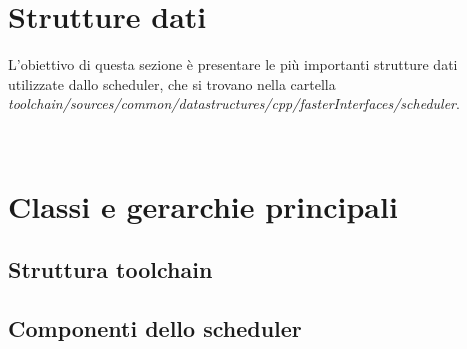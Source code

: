 \section{Strutture dati}
\label{sec:struttureDati}
L'obiettivo di questa sezione è presentare le più importanti strutture dati 
utilizzate dallo scheduler, che si trovano nella cartella 
\emph{toolchain/sources/common/datastructures/cpp/fasterInterfaces/scheduler}.



\

\section{Classi e gerarchie principali}
\label{sec:classiGerarchie}


\subsection{Struttura toolchain}
\label{subsec:strutturaToolchain}


\subsection{Componenti dello scheduler}
\label{subsec:componentiScheduler}

